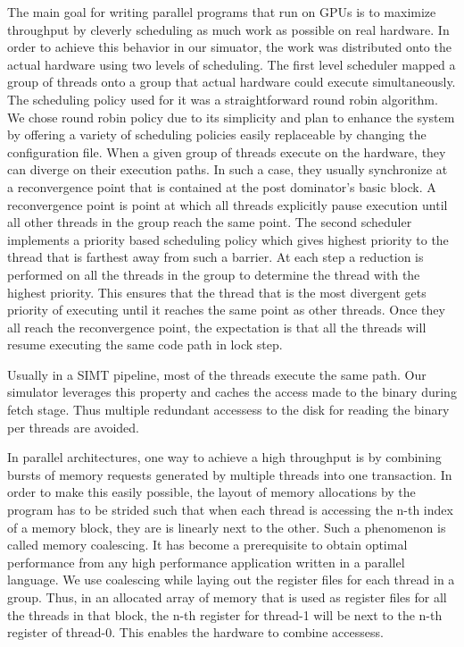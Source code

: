 \documentclass[conference, 10pt]{IEEEtran}
\begin{document}
The main goal for writing parallel programs that run on GPUs is to maximize throughput by 
cleverly scheduling as much work as possible on real hardware. In order to achieve this 
behavior in our simuator, the work was distributed onto the actual hardware using two levels of
scheduling. The first level scheduler mapped a group of threads onto a group that actual hardware 
could execute simultaneously. The scheduling policy used for it was a straightforward round 
robin algorithm. We chose round robin policy due to its simplicity and plan to enhance the system by 
offering a variety of scheduling policies easily replaceable by changing the configuration file.
When a given group of threads execute on the hardware, they can diverge on their execution paths. 
In such a case, they usually synchronize at a reconvergence point that is contained at the post dominator's 
basic block. A reconvergence point is point at which all threads explicitly pause execution 
until all other threads in the group reach the same point. The second scheduler implements a 
priority based scheduling policy which gives highest priority to the thread that is farthest 
away from such a barrier. At each step a reduction is performed on all the threads in the 
group to determine the thread with the highest priority. This ensures that the thread that is 
the most divergent gets priority of executing until it reaches the same point as other threads. 
Once they all reach the reconvergence point, the expectation is that all the threads will resume 
executing the same code path in lock step. 
  
Usually in a SIMT pipeline, most of the threads execute the same path. Our simulator 
leverages this property and caches the access made to the binary during fetch stage. Thus
multiple redundant accessess to the disk for reading the binary per threads are avoided.

In parallel architectures, one way to achieve a high throughput is by combining bursts of 
memory requests generated by multiple threads into one transaction. In order to make this 
easily possible, the layout of memory allocations by the program has to be strided such 
that when each thread is accessing the n-th index of a memory block, they are is linearly 
next to the other. Such a phenomenon is called memory coalescing. It has become a prerequisite 
to obtain optimal performance from any high performance application written in a parallel language. 
We use coalescing while laying out the register files for each thread in a group. Thus, in an 
allocated array of memory that is used as register files for all the threads in that block, the 
n-th register for thread-1 will be next to the n-th register of thread-0. This enables the 
hardware to combine accessess.
 
\end{document}
